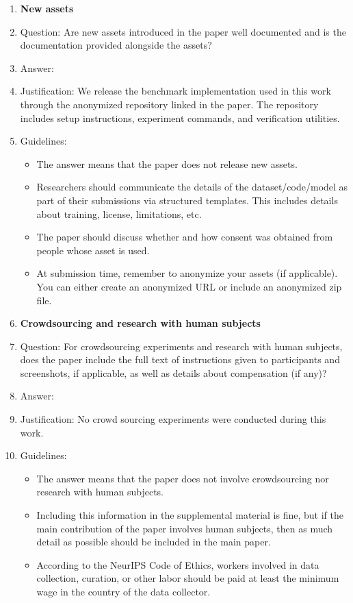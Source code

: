 \documentclass{article}
\begin{document}
\begin{enumerate}
\item {\bf New assets}
    \item[] Question: Are new assets introduced in the paper well documented and is the documentation provided alongside the assets?
    \item[] Answer: \answerYes{} %
    \item[] Justification: We release the benchmark implementation used in this work through the anonymized repository linked in the paper. The repository includes setup instructions, experiment commands, and verification utilities.
    \item[] Guidelines:
    \begin{itemize}
        \item The answer \answerNA{} means that the paper does not release new assets.
        \item Researchers should communicate the details of the dataset\slash code\slash model as part of their submissions via structured templates. This includes details about training, license, limitations, etc.
        \item The paper should discuss whether and how consent was obtained from people whose asset is used.
        \item At submission time, remember to anonymize your assets (if applicable). You can either create an anonymized URL or include an anonymized zip file.
    \end{itemize}


\item {\bf Crowdsourcing and research with human subjects}
    \item[] Question: For crowdsourcing experiments and research with human subjects, does the paper include the full text of instructions given to participants and screenshots, if applicable, as well as details about compensation (if any)?
    \item[] Answer: \answerNA %
    \item[] Justification: No crowd sourcing experiments were conducted during this work.
    \item[] Guidelines:
    \begin{itemize}
        \item The answer \answerNA{} means that the paper does not involve crowdsourcing nor research with human subjects.
        \item Including this information in the supplemental material is fine, but if the main contribution of the paper involves human subjects, then as much detail as possible should be included in the main paper.
        \item According to the NeurIPS Code of Ethics, workers involved in data collection, curation, or other labor should be paid at least the minimum wage in the country of the data collector.
    \end{itemize}


\end{enumerate}
\end{document}
